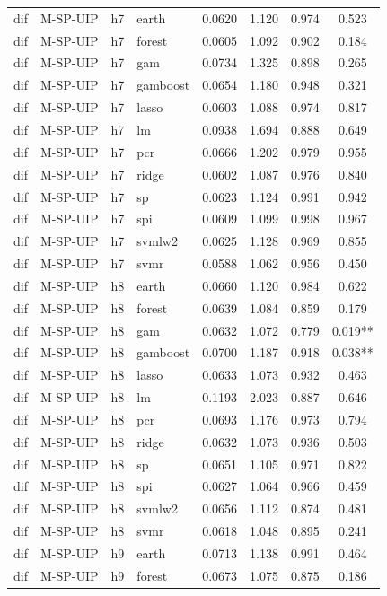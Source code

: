 \begin{ThreePartTable}
\begin{longtable}[t]{llclcccc}
dif & M-SP-UIP & h7 & earth & 0.0620 & 1.120 & 0.974 & 0.523\\
dif & M-SP-UIP & h7 & forest & 0.0605 & 1.092 & 0.902 & 0.184\\
dif & M-SP-UIP & h7 & gam & 0.0734 & 1.325 & 0.898 & 0.265\\
dif & M-SP-UIP & h7 & gamboost & 0.0654 & 1.180 & 0.948 & 0.321\\
dif & M-SP-UIP & h7 & lasso & 0.0603 & 1.088 & 0.974 & 0.817\\
dif & M-SP-UIP & h7 & lm & 0.0938 & 1.694 & 0.888 & 0.649\\
dif & M-SP-UIP & h7 & pcr & 0.0666 & 1.202 & 0.979 & 0.955\\
dif & M-SP-UIP & h7 & ridge & 0.0602 & 1.087 & 0.976 & 0.840\\
dif & M-SP-UIP & h7 & sp & 0.0623 & 1.124 & 0.991 & 0.942\\
dif & M-SP-UIP & h7 & spi & 0.0609 & 1.099 & 0.998 & 0.967\\
dif & M-SP-UIP & h7 & svmlw2 & 0.0625 & 1.128 & 0.969 & 0.855\\
dif & M-SP-UIP & h7 & svmr & 0.0588 & 1.062 & 0.956 & 0.450\\
\addlinespace
dif & M-SP-UIP & h8 & earth & 0.0660 & 1.120 & 0.984 & 0.622\\
dif & M-SP-UIP & h8 & forest & 0.0639 & 1.084 & 0.859 & 0.179\\
dif & M-SP-UIP & h8 & gam & 0.0632 & 1.072 & 0.779 & 0.019**\\
dif & M-SP-UIP & h8 & gamboost & 0.0700 & 1.187 & 0.918 & 0.038**\\
dif & M-SP-UIP & h8 & lasso & 0.0633 & 1.073 & 0.932 & 0.463\\
dif & M-SP-UIP & h8 & lm & 0.1193 & 2.023 & 0.887 & 0.646\\
dif & M-SP-UIP & h8 & pcr & 0.0693 & 1.176 & 0.973 & 0.794\\
dif & M-SP-UIP & h8 & ridge & 0.0632 & 1.073 & 0.936 & 0.503\\
dif & M-SP-UIP & h8 & sp & 0.0651 & 1.105 & 0.971 & 0.822\\
dif & M-SP-UIP & h8 & spi & 0.0627 & 1.064 & 0.966 & 0.459\\
dif & M-SP-UIP & h8 & svmlw2 & 0.0656 & 1.112 & 0.874 & 0.481\\
dif & M-SP-UIP & h8 & svmr & 0.0618 & 1.048 & 0.895 & 0.241\\
\addlinespace
dif & M-SP-UIP & h9 & earth & 0.0713 & 1.138 & 0.991 & 0.464\\
dif & M-SP-UIP & h9 & forest & 0.0673 & 1.075 & 0.875 & 0.186\\

\end{longtable}
\end{ThreePartTable}
